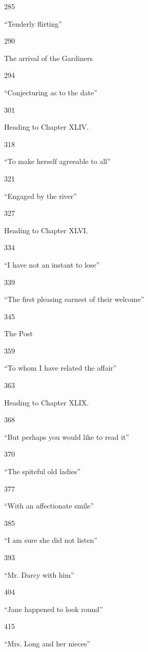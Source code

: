 \documentclass[10pt]{book}
\begin{document}
       285
      

      “Tenderly flirting”
     

       290
      

      The arrival of the Gardiners
     

       294
      

      “Conjecturing as to the date”
     

       301
      

      Heading to Chapter XLIV.
     

       318
      

      “To make herself agreeable to all”
     

       321
      

      “Engaged by the river”
     

       327
      

      Heading to Chapter XLVI.
     

       334
      

      “I have not an instant to lose”
     

       339
      

      “The first pleasing earnest of their welcome”
     

       345
      

      The Post
     

       359
      

      “To whom I have related the affair”
     

       363
      

      Heading to Chapter XLIX.
     

       368
      

      “But perhaps you would like to read it”
     

       370
      

      “The spiteful old ladies”
     

       377
      

      “With an affectionate smile”
     

       385
      

      “I am sure she did not listen”
     

       393
      

      “Mr. Darcy with him”
     

       404
      

      “Jane happened to look round”
     

       415
      

      “Mrs. Long and her nieces”
     
\end{document}
